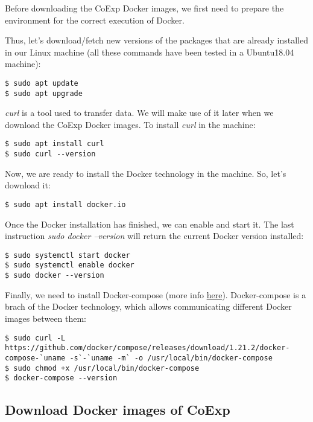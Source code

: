 \documentclass[]{book}
\begin{document}
Before downloading the CoExp Docker images, we first need to prepare the
environment for the correct execution of Docker.

Thus, let's download/fetch new versions of the packages that are already
installed in our Linux machine (all these commands have been tested in a
Ubuntu18.04 machine):

\begin{verbatim}
$ sudo apt update
$ sudo apt upgrade
\end{verbatim}

\emph{curl} is a tool used to transfer data. We will make use of it
later when we download the CoExp Docker images. To install \emph{curl}
in the machine:

\begin{verbatim}
$ sudo apt install curl
$ sudo curl --version
\end{verbatim}

Now, we are ready to install the Docker technology in the machine. So,
let's download it:

\begin{verbatim}
$ sudo apt install docker.io
\end{verbatim}

Once the Docker installation has finished, we can enable and start it.
The last instruction \emph{sudo docker --version} will return the
current Docker version installed:

\begin{verbatim}
$ sudo systemctl start docker
$ sudo systemctl enable docker
$ sudo docker --version
\end{verbatim}

Finally, we need to install Docker-compose (more info
\href{https://www.digitalocean.com/community/tutorials/how-to-install-docker-compose-on-ubuntu-18-04}{here}).
Docker-compose is a brach of the Docker technology, which allows
communicating different Docker images between them:

\begin{verbatim}
$ sudo curl -L https://github.com/docker/compose/releases/download/1.21.2/docker-compose-`uname -s`-`uname -m` -o /usr/local/bin/docker-compose
$ sudo chmod +x /usr/local/bin/docker-compose
$ docker-compose --version
\end{verbatim}

\subsection{Download Docker images of
CoExp}\label{download-docker-images-of-coexp}
\end{document}
